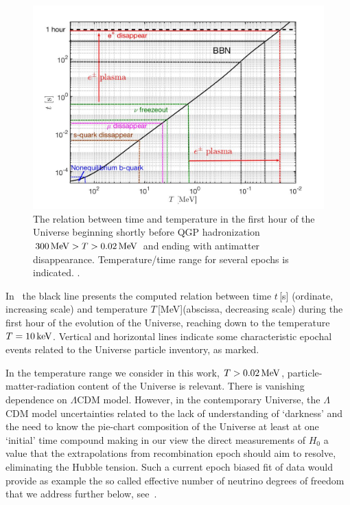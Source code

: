 \begin{figure}
\centerline{\includegraphics[width=0.85\linewidth]{plots/CosmicTimeTemperature.jpg}}
 \caption{The relation between time and temperature in the first hour of the Universe beginning shortly before QGP hadronization $300\text{\,MeV} >T>0.02\text{\,MeV} $ and ending with antimatter disappearance. Temperature/time range for several epochs is indicated. .}
 \label{Fig:Overview}
\end{figure}

In~ the black line presents the computed relation between time $t$\,[s] (ordinate, increasing scale) and temperature $T$\,[MeV](abscissa, decreasing scale) during the first hour of the evolution of the Universe, reaching down to the temperature $T=10\text{\,keV}$. Vertical and horizontal lines indicate some characteristic epochal events related to the Universe particle inventory, as marked. 

In the temperature range we consider in this work, $T>0.02\text{\,MeV}$, particle-matter-radiation content of the Universe is relevant. There is vanishing dependence on $\Lambda$CDM model. However, in the contemporary Universe, the $\Lambda$CDM model uncertainties related to the lack of understanding of `darkness' and the need to know the pie-chart composition of the Universe at least at one `initial' time compound making in our view the direct measurements of $H_0$ a value that the extrapolations from recombination epoch should aim to resolve, eliminating the Hubble tension. Such a current epoch biased fit of data would provide as example the so called effective number of neutrino degrees of freedom that we address further below, see~.


